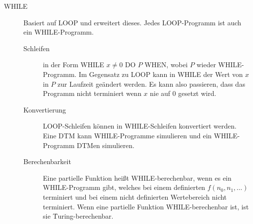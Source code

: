 \begin{description}
\newpage
        \item[WHILE] Basiert auf LOOP und erweitert dieses. Jedes LOOP-Programm ist auch ein WHILE-Programm.
            \begin{description}
                \item[Schleifen] in der Form WHILE $x \neq 0$ DO $P$ WHEN, wobei $P$ wieder WHILE-Programm. Im Gegensatz zu LOOP kann in WHILE der Wert von $x$ in $P$ zur Laufzeit geändert werden. Es kann also passieren, dass das Programm nicht terminiert wenn $x$ nie auf $0$ gesetzt wird.
                \item[Konvertierung] LOOP-Schleifen können in WHILE-Schleifen konvertiert werden. Eine DTM kann WHILE-Programme simulieren und ein WHILE-Programm DTMen simulieren.
                \item[Berechenbarkeit] Eine partielle Funktion heißt WHILE-berechenbar, wenn es ein WHILE-Programm gibt, welches bei einem definierten $f(n_0,n_1,…)$ terminiert und bei einem nicht definierten Wertebereich nicht terminiert. Wenn eine partielle Funktion WHILE-berechenbar ist, ist sie \f{Turing-berechenbar}.
            \end{description}
    \end{description}


